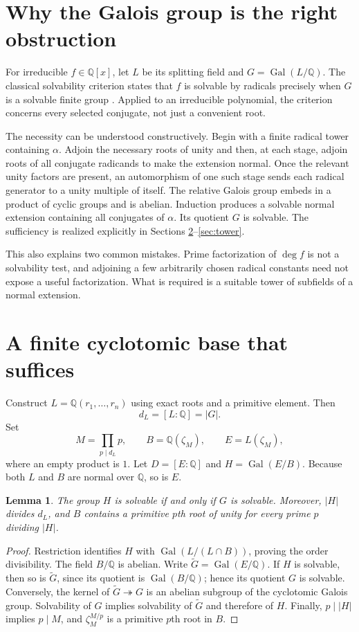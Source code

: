 \documentclass[11pt,letterpaper]{article}
\newtheorem{lemma}[theorem]{Lemma}
\theoremstyle{definition}\newtheorem{definition}[theorem]{Definition}
\theoremstyle{remark}\newtheorem{remark}[theorem]{Remark}
\newcommand{\Q}{\mathbb Q}
\newcommand{\Gal}{\operatorname{Gal}}
\begin{document}
\section{Why the Galois group is the right obstruction}
\label{sec:obstruction}
For irreducible $f\in\Q[x]$, let $L$ be its splitting field and
$G=\Gal(L/\Q)$. The classical solvability criterion states that $f$ is
solvable by radicals precisely when $G$ is a solvable finite group
\cite[Theorem 3.28]{milne}. Applied to an irreducible polynomial, the
criterion concerns every selected conjugate, not just a convenient root.

The necessity can be understood constructively. Begin with a finite radical
tower containing $\alpha$. Adjoin the necessary roots of unity and then,
at each stage, adjoin roots of all conjugate radicands to make the extension
normal. Once the relevant unity factors are present, an automorphism of
one such stage sends each radical generator to a unity multiple of itself.
The relative Galois group embeds in a product of cyclic groups and is
abelian. Induction produces a solvable normal extension containing all
conjugates of $\alpha$. Its quotient $G$ is solvable. The sufficiency is
realized explicitly in Sections \ref{sec:cyclotomic}--\ref{sec:tower}.

This also explains two common mistakes. Prime factorization of $\deg f$
is not a solvability test, and adjoining a few arbitrarily chosen radical
constants need not expose a useful factorization. What is required is a
suitable tower of subfields of a normal extension.

\section{A finite cyclotomic base that suffices}
\label{sec:cyclotomic}
Construct $L=\Q(r_1,\ldots,r_n)$ using exact roots and a primitive element.
Then
\[
 d_L=[L:\Q]=|G|.
\]
Set
\begin{equation}\label{eq:cyclotomicbase}
 M=\prod_{p\mid d_L}p,\qquad B=\Q(\zeta_M),\qquad E=L(\zeta_M),
\end{equation}
where an empty product is $1$. Let $D=[E:\Q]$ and
$H=\Gal(E/B)$. Because both $L$ and $B$ are normal over $\Q$, so is $E$.

\begin{lemma}\label{lem:cyclotomic}
The group $H$ is solvable if and only if $G$ is solvable. Moreover,
$|H|$ divides $d_L$, and $B$ contains a primitive $p$th root of unity
for every prime $p$ dividing $|H|$.
\end{lemma}
\begin{proof}
Restriction identifies $H$ with $\Gal(L/(L\cap B))$, proving the
order divisibility. The field $B/\Q$ is abelian. Write
$\widetilde G=\Gal(E/\Q)$. If $H$ is solvable, then so is
$\widetilde G$, since its quotient is $\Gal(B/\Q)$; hence its quotient
$G$ is solvable. Conversely, the kernel of
$\widetilde G\twoheadrightarrow G$ is an abelian subgroup of the
cyclotomic Galois group. Solvability of $G$ implies solvability of
$\widetilde G$ and therefore of $H$. Finally, $p\mid |H|$ implies
$p\mid M$, and $\zeta_M^{M/p}$ is a primitive $p$th root in $B$.
\end{proof}
\end{document}
